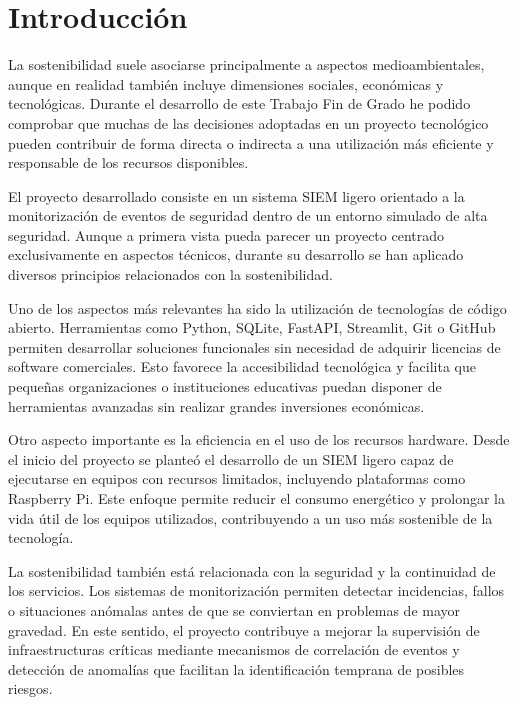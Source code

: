 
\section{Introducción}

La sostenibilidad suele asociarse principalmente a aspectos medioambientales, aunque en realidad también incluye dimensiones sociales, económicas y tecnológicas. Durante el desarrollo de este Trabajo Fin de Grado he podido comprobar que muchas de las decisiones adoptadas en un proyecto tecnológico pueden contribuir de forma directa o indirecta a una utilización más eficiente y responsable de los recursos disponibles.

El proyecto desarrollado consiste en un sistema SIEM ligero orientado a la monitorización de eventos de seguridad dentro de un entorno simulado de alta seguridad. Aunque a primera vista pueda parecer un proyecto centrado exclusivamente en aspectos técnicos, durante su desarrollo se han aplicado diversos principios relacionados con la sostenibilidad.

Uno de los aspectos más relevantes ha sido la utilización de tecnologías de código abierto. Herramientas como Python, SQLite, FastAPI, Streamlit, Git o GitHub permiten desarrollar soluciones funcionales sin necesidad de adquirir licencias de software comerciales. Esto favorece la accesibilidad tecnológica y facilita que pequeñas organizaciones o instituciones educativas puedan disponer de herramientas avanzadas sin realizar grandes inversiones económicas.

Otro aspecto importante es la eficiencia en el uso de los recursos hardware. Desde el inicio del proyecto se planteó el desarrollo de un SIEM ligero capaz de ejecutarse en equipos con recursos limitados, incluyendo plataformas como Raspberry Pi. Este enfoque permite reducir el consumo energético y prolongar la vida útil de los equipos utilizados, contribuyendo a un uso más sostenible de la tecnología.

La sostenibilidad también está relacionada con la seguridad y la continuidad de los servicios. Los sistemas de monitorización permiten detectar incidencias, fallos o situaciones anómalas antes de que se conviertan en problemas de mayor gravedad. En este sentido, el proyecto contribuye a mejorar la supervisión de infraestructuras críticas mediante mecanismos de correlación de eventos y detección de anomalías que facilitan la identificación temprana de posibles riesgos.

